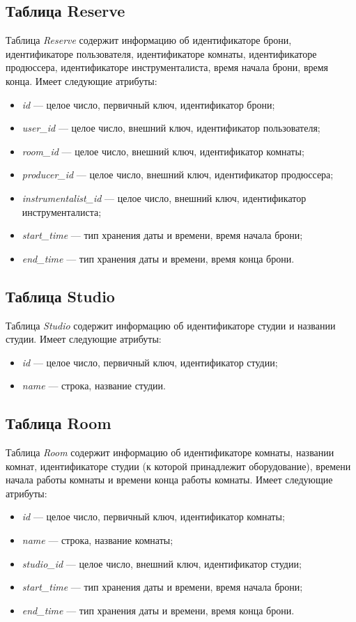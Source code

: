 \subsection{Таблица Reserve}
Таблица \textit{Reserve} содержит информацию об идентификаторе брони, идентификаторе пользователя, идентификаторе комнаты, идентификаторе продюссера, идентификаторе инструменталиста, время начала брони, время конца.
Имеет следующие атрибуты:
\begin{itemize}
	\item \textit{id} --- целое число, первичный ключ, идентификатор брони;
	\item \textit{user\_id} --- целое число, внешний ключ, идентификатор пользователя;
	\item \textit{room\_id} --- целое число, внешний ключ, идентификатор комнаты;
	\item \textit{producer\_id} --- целое число, внешний ключ, идентификатор продюссера;
	\item \textit{instrumentalist\_id} --- целое число, внешний ключ, идентификатор инструменталиста;
	\item \textit{start\_time} --- тип хранения даты и времени, время начала брони;
	\item \textit{end\_time} --- тип хранения даты и времени, время конца брони.
\end{itemize}
\subsection{Таблица Studio}
Таблица \textit{Studio} содержит информацию об идентификаторе студии и названии студии.
Имеет следующие атрибуты:
\begin{itemize}
	\item \textit{id} --- целое число, первичный ключ, идентификатор студии;
	\item \textit{name} --- строка, название студии.
\end{itemize}
\subsection{Таблица Room}
Таблица \textit{Room} содержит информацию об идентификаторе комнаты, названии комнат, идентификаторе студии (к которой принадлежит оборудование), времени начала работы комнаты и времени конца работы комнаты.
Имеет следующие атрибуты:
\begin{itemize}
	\item \textit{id} --- целое число, первичный ключ, идентификатор комнаты;
	\item \textit{name} --- строка, название комнаты;
	\item \textit{studio\_id} --- целое число, внешний ключ, идентификатор студии;
	\item \textit{start\_time} --- тип хранения даты и времени, время начала брони;
	\item \textit{end\_time} --- тип хранения даты и времени, время конца брони.
\end{itemize}
